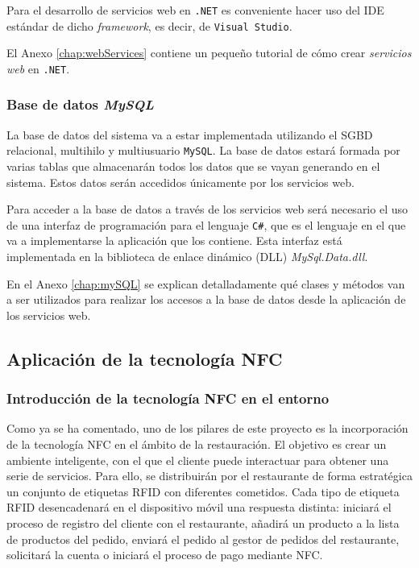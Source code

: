 Para el desarrollo de servicios web en \texttt{.NET} es conveniente hacer uso
del \acs{IDE} estándar de dicho \emph{framework}, es decir, de \texttt{Visual
Studio}.

El Anexo \ref{chap:webServices} contiene un pequeño tutorial de cómo
crear \emph{servicios web} en \texttt{.NET}.

    \subsubsection{Base de datos \emph{MySQL}}
La base de datos del sistema va a estar implementada utilizando el \acs{SGBD}
relacional, multihilo y multiusuario \texttt{MySQL}. La base de datos
estará formada por varias tablas que almacenarán todos los datos que se
vayan generando en el sistema. Estos datos serán accedidos únicamente por
los servicios web.

Para acceder a la base de datos a través de los servicios web será necesario
el uso de una interfaz de programación para el lenguaje \texttt{C\#}, que es
el lenguaje en el que va a implementarse la aplicación que los contiene. Esta
interfaz está implementada en la biblioteca de enlace dinámico (\acs{DLL})
\emph{MySql.Data.dll}.

En el Anexo \ref{chap:mySQL} se explican detalladamente qué clases y métodos
van a ser utilizados para realizar los accesos a la base de datos desde la
aplicación de los servicios web.

  \subsection{Aplicación de la tecnología \acs{NFC}}
  \label{subsec:nfcApp}
    \subsubsection{Introducción de la tecnología \acs{NFC} en el entorno}
Como ya se ha comentado, uno de los pilares de este proyecto es la
incorporación de la tecnología \acs{NFC} en el ámbito de la restauración.
El objetivo es crear un ambiente inteligente, con el que el cliente puede 
interactuar para obtener una serie de servicios. Para ello, se distribuirán 
por el restaurante de forma estratégica un conjunto de etiquetas \acs{RFID} 
con diferentes cometidos. Cada tipo de etiqueta \acs{RFID} desencadenará en el 
dispositivo móvil una respuesta distinta: iniciará el proceso de registro del 
cliente con el restaurante, añadirá un producto a la lista de productos del 
pedido, enviará el pedido al gestor de pedidos del restaurante, solicitará la 
cuenta o iniciará el proceso de pago mediante \acs{NFC}.

